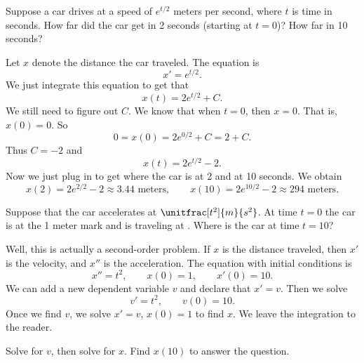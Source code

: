 \begin{example}
Suppose a car drives at a speed of $e^{t/2}$ meters per second,
where $t$ is time in seconds.
How far did the car get in 2 seconds (starting at $t=0$)?  How far in 10 seconds?

Let $x$ denote the distance the car traveled.
The equation is
\begin{equation*}
x' = e^{t/2} .
\end{equation*}
We just integrate this equation to get that
\begin{equation*}
x(t) = 2 e^{t/2} + C . 
\end{equation*}
We still need to figure out $C$.  We know that when $t=0$, then
$x=0$.  That is, $x(0) = 0$.  So
\begin{equation*}
0 = x(0) = 2e^{0/2} + C = 2 + C .
\end{equation*}
Thus $C = -2$ and 
\begin{equation*}
x(t) = 2 e^{t/2} - 2 .
\end{equation*}
Now we just plug in to get where the car is at 2 and at 10 seconds.
We obtain
\begin{equation*}
x(2) = 2e^{2/2} - 2 \approx 3.44 \text{ meters} ,
\qquad
x(10) = 2e^{10/2} - 2 \approx 294 \text{ meters} .
\end{equation*}
\end{example}

\begin{example}
Suppose that the car accelerates at $\unitfrac[t^2]{m}{s^2}$.
At time $t=0$ the car is at the 1 meter mark and is traveling at
.  Where is the car at time $t=10$?

Well, this is actually a second-order problem.  If $x$ is the distance
traveled, then $x'$ is the velocity, and $x''$ is the acceleration.
The equation with initial conditions is
\begin{equation*}
x'' = t^2 , \qquad x(0) = 1 , \qquad x'(0) = 10 .
\end{equation*}
We can add a new dependent variable $v$ and declare that $x' = v$.  Then we solve
\begin{equation*}
v' = t^2, \qquad v(0) = 10 .
\end{equation*}
Once we find $v$, we solve $x' = v$, $x(0)=1$ to find $x$.
We leave the integration to the reader.
\end{example}

\begin{exercise}
Solve for $v$, then solve for $x$.  Find $x(10)$ to answer the
question.
\end{exercise}

